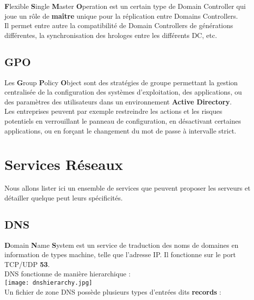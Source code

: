 \documentclass{report}
\begin{document}
		\textbf{F}lexible \textbf{S}ingle \textbf{M}aster \textbf{O}peration est un certain type de Domain Controller qui joue un rôle de \textbf{maître} unique pour la réplication entre Domains Controllers.\\
		Il permet entre autre la compatibilité de Domain Controllers de générations différentes, la synchronisation des hrologes entre les différents DC, etc.\\

	\section{GPO}

		Les \textbf{G}roup \textbf{P}olicy \textbf{O}bject sont des stratégies de groupe permettant la gestion centralisée de la configuration des systèmes d'exploitation, des applications, ou des paramètres des utilisateurs dans un environnement \textbf{Active Directory}.\\
		Les entreprises peuvent par exemple restreindre les actions et les risques potentiels en verrouillant le panneau de configuration, en désactivant certaines applications, ou en forçant le changement du mot de passe à intervalle strict.\\


\chapter{Services Réseaux}
	
	Nous allons lister ici un ensemble de services que peuvent proposer les serveurs et détailler quelque peut leurs spécificités.\\

	\section{DNS}

		\textbf{D}omain \textbf{N}ame \textbf{S}ystem est un service de traduction des noms de domaines en information de types machine, telle que l'adresse IP. Il fonctionne sur le port TCP/UDP \textbf{53}.\\

		DNS fonctionne de manière hierarchique : \\

		\texttt{[image: dnshierarchy.jpg]}\\

		Un fichier de zone DNS possède plusieurs types d'entrées dits \textbf{records} : \\
\end{document}
